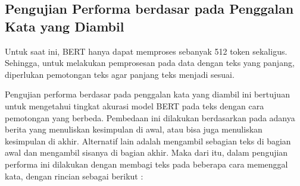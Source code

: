 \subsection{Pengujian Performa berdasar pada Penggalan Kata yang Diambil}

Untuk saat ini, BERT hanya dapat memproses sebanyak 512 token sekaligus. Sehingga, untuk melakukan pemprosesan pada data dengan teks yang panjang, diperlukan pemotongan teks agar panjang teks menjadi sesuai.

Pengujian performa berdasar pada penggalan kata yang diambil ini bertujuan untuk mengetahui tingkat akurasi model BERT pada teks dengan cara pemotongan yang berbeda. Pembedaan ini dilakukan berdasarkan pada adanya berita yang menuliskan kesimpulan di awal, atau bisa juga menuliskan kesimpulan di akhir. Alternatif lain adalah mengambil sebagian teks di bagian awal dan mengambil sisanya di bagian akhir. Maka dari itu, dalam pengujian performa ini dilakukan dengan membagi teks pada beberapa cara memenggal kata, dengan rincian sebagai berikut :

